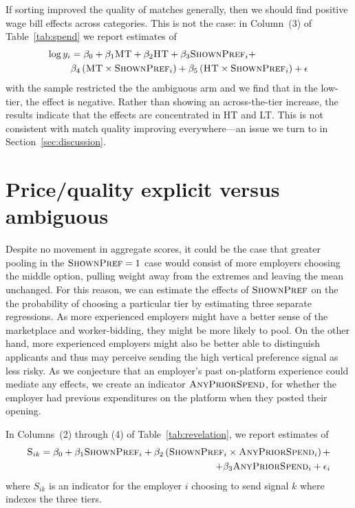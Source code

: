 

If sorting improved the quality of matches generally, then we should find positive wage bill effects across categories.
This is not the case: 
in Column~(3) of Table~\ref{tab:spend} we report estimates of 
\begin{align} \label{eq:spendi}
  \log y_i & =  \beta_0 + \beta_1 \textsc{MT} + \beta_2 \textsc{HT} + \beta_3 \textsc{ShownPref}_i + \nonumber\\  
           & \beta_4 \left(\textsc{MT} \times \textsc{ShownPref}_i \right) + \beta_5 \left(\textsc{HT} \times \textsc{ShownPref}_i\right) + \epsilon
\end{align}
with the sample restricted the the ambiguous arm and we find that in the low-tier, the effect is negative.
Rather than showing an across-the-tier increase, the results indicate that the effects are concentrated in HT and LT.
This is not consistent with match quality improving everywhere---an issue we turn to in Section~\ref{sec:discussion}. 


\section{Price/quality explicit versus ambiguous} \label{sec:explicit_versus_ambiguous} 

Despite no movement in aggregate scores, it could be the case that greater pooling in the $\textsc{ShownPref} = 1$ case would consist of more employers choosing the middle option, pulling weight away from the extremes and leaving the mean unchanged.
For this reason, we can estimate the effects of $\textsc{ShownPref}$ on the the probability of choosing a particular tier by estimating three separate regressions.  
As more experienced employers might have a better sense of the marketplace and worker-bidding, they might be more likely to pool.
On the other hand, more experienced employers might also be better able to distinguish applicants and thus may perceive sending the high vertical preference signal as less risky. 
As we conjecture that an employer's past on-platform experience could mediate any effects, we create an indicator $\textsc{AnyPriorSpend}$, for whether the employer had previous expenditures on the platform when they posted their opening.  



In Columns~(2) through (4) of Table~\ref{tab:revelation}, we report estimates of 
\begin{align} \label{eq:tieri}
  \textsc{S}_{ik} = \beta_0 + \beta_1 \textsc{ShownPref}_i + \beta_2 \left( \textsc{ShownPref}_i \times \textsc{AnyPriorSpend}_i \right ) + \nonumber \\
   + \beta_3 \textsc{AnyPriorSpend}_i + \epsilon_i
\end{align} 
where $S_{ik}$ is an indicator for the employer $i$ choosing to send signal $k$ where indexes the three tiers. 

